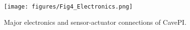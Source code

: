 




 


\begin{figure}[t]
    \centering
    \texttt{[image: figures/Fig4\_Electronics.png]}%
    \vspace{-1mm}
    \caption{Major electronics and sensor-actuator connections of CavePI.}
    \label{fig:electronics}
    \vspace{-3mm}
\end{figure}


